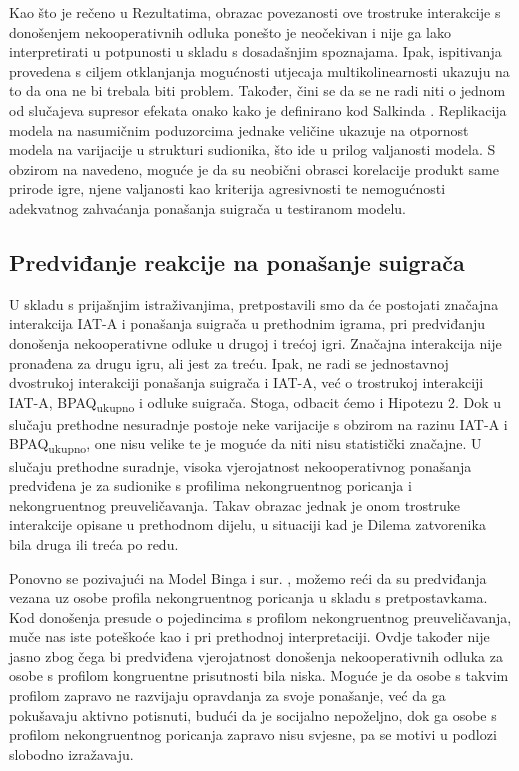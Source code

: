 \documentclass[a4paper, 12pt]{report}
\begin{document}
Kao što je rečeno u Rezultatima, obrazac povezanosti ove trostruke interakcije s
donošenjem nekooperativnih odluka ponešto je neočekivan i nije ga lako
interpretirati u potpunosti u skladu s dosadašnjim spoznajama. 
Ipak, ispitivanja provedena s ciljem otklanjanja mogućnosti utjecaja
multikolinearnosti ukazuju na to da ona ne bi trebala biti problem. 
Također, čini se da se ne radi niti o jednom od slučajeva supresor efekata 
onako kako je definirano kod Salkinda \citeyearpar{salkind2007encyclopedia}.  
Replikacija modela na nasumičnim poduzorcima jednake veličine ukazuje na
otpornost modela na varijacije u strukturi sudionika, što ide u prilog
valjanosti modela. S obzirom na navedeno, moguće je da su neobični obrasci
korelacije produkt same prirode igre, njene valjanosti kao kriterija
agresivnosti te nemogućnosti adekvatnog zahvaćanja ponašanja suigrača u
testiranom modelu.

\subsection{Predviđanje reakcije na ponašanje suigrača} 

U skladu s prijašnjim istraživanjima,
pretpostavili smo da će postojati značajna interakcija IAT-A i ponašanja
suigrača u prethodnim igrama, pri predviđanju donošenja nekooperativne odluke u
drugoj i trećoj igri. Značajna interakcija nije pronađena za drugu igru, ali
jest za treću. Ipak, ne radi se jednostavnoj dvostrukoj interakciji ponašanja
suigrača i IAT-A, već o trostrukoj interakciji IAT-A, BPAQ\textsubscript{ukupno}
i odluke suigrača. Stoga, odbacit ćemo i Hipotezu 2.
Dok u slučaju prethodne nesuradnje postoje neke varijacije s
obzirom na razinu IAT-A i BPAQ\textsubscript{ukupno}, one nisu velike
te je moguće da niti nisu statistički značajne. U slučaju prethodne suradnje, 
visoka vjerojatnost nekooperativnog ponašanja predviđena je za sudionike s
profilima nekongruentnog poricanja i nekongruentnog preuveličavanja. Takav
obrazac jednak je onom trostruke interakcije opisane u prethodnom dijelu, u
situaciji kad je Dilema zatvorenika bila druga ili treća po redu.

Ponovno se pozivajući na Model Binga i sur. \citeyearpar{bing2007integrating},
možemo reći da su predviđanja vezana uz osobe profila nekongruentnog
poricanja u skladu s pretpostavkama. Kod donošenja presude o pojedincima s
profilom nekongruentnog preuveličavanja, muče nas iste poteškoće kao i pri
prethodnoj interpretaciji. Ovdje također nije jasno zbog čega bi predviđena
vjerojatnost donošenja nekooperativnih odluka za osobe s profilom kongruentne
prisutnosti bila niska.
Moguće je da osobe s takvim profilom zapravo
ne razvijaju opravdanja za svoje ponašanje, već da ga pokušavaju aktivno
potisnuti, budući da je socijalno nepoželjno, dok ga osobe s profilom
nekongruentnog poricanja zapravo nisu svjesne, pa se motivi u podlozi slobodno
izražavaju. 
\end{document}

